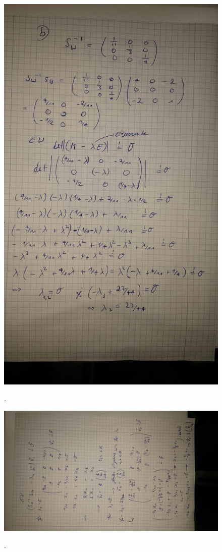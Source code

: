 \FloatBarrier
\begin{figure}
  \centering
  \includegraphics[width=\textwidth]{bild3.jpeg}
  \caption{}.
  \label{fig:3}
\end{figure}
\FloatBarrier

\FloatBarrier
\begin{figure}
  \centering
  \includegraphics[width=\textwidth]{bild4.jpeg}
  \caption{}.
  \label{fig:4}
\end{figure}
\FloatBarrier

